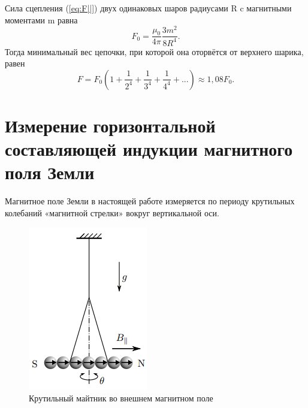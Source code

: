 Сила сцепления (\ref{eq:F||}) двух одинаковых шаров радиусами R c магнитными моментами m равна
\begin{equation}
    F_0=\frac{\mu_0}{4 \pi}\frac{3m^2}{8R^4}.
    \label{eq:F0}
\end{equation}
Тогда минимальный вес цепочки, при которой она оторвётся от верхнего
шарика, равен
\begin{equation}
    F=F_0\left(1+\frac{1}{2^4}+\frac{1}{3^4}+\frac{1}{4^4}+...\right)\approx1,08F_0.
    \label{eq:1,08F0}
\end{equation}

\section{Измерение горизонтальной составляющей индукции магнитного
поля Земли}

Магнитное поле Земли в настоящей работе измеряется по периоду
крутильных колебаний «магнитной стрелки» вокруг вертикальной оси.
\begin{figure}
    \includegraphics[width=\linewidth]{B||.png}
    \caption{Крутильный майтник во внешнем магнитном поле}
    \label{fig:B||}
\end{figure}

